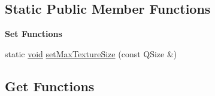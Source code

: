 \subsection*{Static Public Member Functions}
\begin{Indent}{\bf Set Functions}\par
\begin{DoxyCompactItemize}
\item 
static \hyperlink{group___u_a_v_objects_plugin_ga444cf2ff3f0ecbe028adce838d373f5c}{void} \hyperlink{class_g_l_c___texture_a0bb8b419472e4eb4948020b250c6170a}{set\-Max\-Texture\-Size} (const Q\-Size \&)
\end{DoxyCompactItemize}
\end{Indent}
\subsection*{Get Functions}
